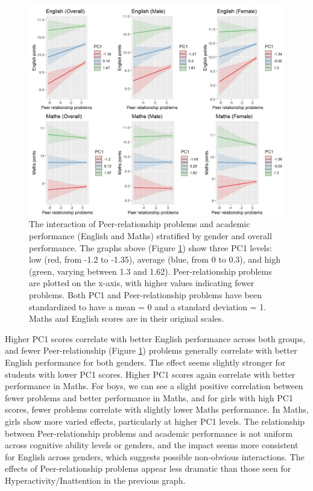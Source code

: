 \documentclass[12pt,a4paper,onecolumn]{article}
\numberwithin{equation}{section}
\begin{document}
\begin{figure}[ht] 
    \centering
    \includegraphics[width=1\linewidth]{AVE_SDQ_Peer.JPG}
    \caption{The interaction of Peer-relationship problems and academic performance (English and Maths) stratified by gender and overall performance. The graphs above (Figure \ref{Fig4}) show three PC1 levels: low (red, from -1.2 to -1.35), average (blue, from 0 to 0.3), and high (green, varying between 1.3 and 1.62). Peer-relationship problems are plotted on the x-axis, with higher values indicating fewer problems. Both PC1 and Peer-relationship problems have been standardized to have a mean = 0 and a standard deviation = 1. Maths and English scores are in their original scales.
}
    \label{Fig4}
\end{figure}

Higher PC1 scores correlate with better English performance across both groups, and fewer Peer-relationship (Figure \ref{Fig4}) problems generally correlate with better English performance for both genders. The effect seems slightly stronger for students with lower PC1 scores. Higher PC1 scores again correlate with better performance in Maths. For boys, we can see a slight positive correlation between fewer problems and better performance in Maths, and for girls with high PC1 scores, fewer problems correlate with slightly lower Maths performance. In Maths, girls show more varied effects, particularly at higher PC1 levels. The relationship between Peer-relationship problems and academic performance is not uniform across cognitive ability levels or genders, and the impact seems more consistent for English across genders, which suggests possible non-obvious interactions. The effects of Peer-relationship problems appear less dramatic than those seen for Hyperactivity/Inattention in the previous graph.
\end{document}
